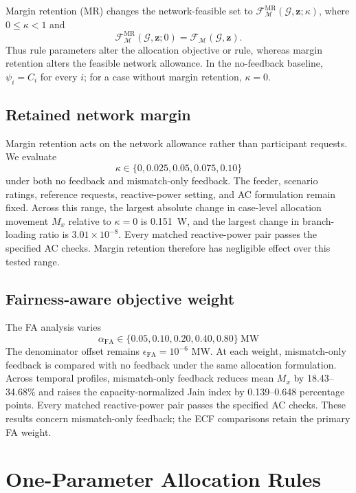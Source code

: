 \documentclass[11pt]{article}
\begin{document}
Margin retention (MR) changes the network-feasible set to
$\mathcal F_{\mathcal M}^{\mathrm{MR}}(\mathcal G,\mathbf z;\kappa)$, where
$0\le\kappa<1$ and
\begin{equation}
\mathcal F_{\mathcal M}^{\mathrm{MR}}(\mathcal G,\mathbf z;0)
=\mathcal F_{\mathcal M}(\mathcal G,\mathbf z).
\label{eq:supp_mr_recovery}
\end{equation}
Thus rule parameters alter the allocation objective or rule, whereas margin
retention alters the feasible network allowance. In the no-feedback baseline,
$\psi_i=C_i$ for every $i$; for a case without margin retention,
$\kappa=0$.

\subsection{Retained network margin}

Margin retention acts on the network allowance rather than participant
requests. We evaluate
\[
\kappa\in\{0,0.025,0.05,0.075,0.10\}
\]
under both no feedback and mismatch-only feedback. The feeder, scenario ratings,
reference requests, reactive-power setting, and AC formulation remain fixed.
Across this range, the largest absolute change in case-level allocation movement
$M_x$ relative to $\kappa=0$ is 0.151~W, and the largest change in
branch-loading ratio is $3.01\times10^{-8}$. Every matched reactive-power pair
passes the specified AC checks. Margin retention therefore has negligible
effect over this tested range.

\subsection{Fairness-aware objective weight}

The FA analysis varies
\[
\alpha_{\mathrm{FA}}\in\{0.05,0.10,0.20,0.40,0.80\}\ \mathrm{MW}
\]
The denominator offset remains $\epsilon_{\mathrm{FA}}=10^{-6}$ MW. At each
weight, mismatch-only feedback is compared with no feedback under the same
allocation formulation. Across temporal profiles, mismatch-only feedback
reduces mean $M_x$ by 18.43--34.68\% and raises the capacity-normalized Jain
index by 0.139--0.648 percentage points. Every matched reactive-power pair
passes the specified AC checks. These results concern mismatch-only feedback;
the ECF comparisons retain the primary FA weight.

\section{One-Parameter Allocation Rules}
\label{supp:one_parameter_rules}
\end{document}
